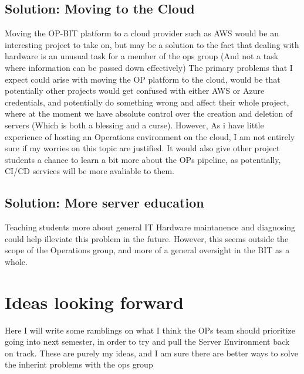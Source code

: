 \documentclass{article}
\begin{document}
\subsection{Solution: Moving to the Cloud}
Moving the OP-BIT platform to a cloud provider such as AWS would be an interesting project to take on, but may be a solution to the fact that dealing with hardware
is an unusual task for a member of the ops group (And not a task where information can be passed down effectively) The primary problems that I expect could arise 
with moving the OP platform to the cloud, would be that potentially other projects would get confused with either AWS or Azure credentials, and potentially do something wrong and affect their whole project, where at the moment we have absolute control over the creation and deletion of servers (Which is both a blessing and a 
curse). However, As i have little experience of hosting an Operations environment on the cloud, I am not entirely sure if my worries on this topic are justified. It would also give other project students a chance to learn a bit more about the OPs pipeline, as potentially, CI/CD services will be more avaliable to them.
\subsection{Solution: More server education}
Teaching students more about general IT Hardware maintanence and diagnosing could help illeviate this problem in the future. However, this seems outside the scope of
the Operations group, and more of a general oversight in the BIT as a whole.

\section{Ideas looking forward}
Here I will write some ramblings on what I think the OPs team should prioritize going into next semester, in order to try and pull the Server Environment back
on track. These are purely my ideas, and I am sure there are better ways to solve the inherint problems with the ops group
\end{document}
